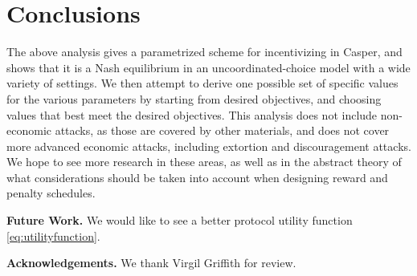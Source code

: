 \documentclass[12pt, final]{article}
\begin{document}
\section{Conclusions}

The above analysis gives a parametrized scheme for incentivizing in Casper, and shows that it is a Nash equilibrium in an uncoordinated-choice model with a wide variety of settings. We then attempt to derive one possible set of specific values for the various parameters by starting from desired objectives, and choosing values that best meet the desired objectives. This analysis does not include non-economic attacks, as those are covered by other materials, and does not cover more advanced economic attacks, including extortion and discouragement attacks. We hope to see more research in these areas, as well as in the abstract theory of what considerations should be taken into account when designing reward and penalty schedules.


\textbf{Future Work.} We would like to see a better protocol utility function \eqref{eq:utilityfunction}.  

\textbf{Acknowledgements.}  We thank Virgil Griffith for review.





\end{document}
